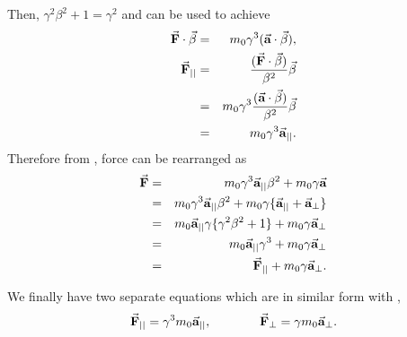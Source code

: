 \documentclass[a4paper,oneside,12pt]{report}
\numberwithin{equation}{chapter}
\begin{document}
Then, $\gamma^2 \beta^2 + 1 = \gamma^2 $ and  can be used to achieve
\vspace{-10pt}
\begin{eqnarray}
    \dotProd{\textbf{F}}{\beta} &=& m_0 \gamma^3 (\dotProd{\textbf{a}}{\beta} )   , \nonumber \\
    \vecthreeBF{F}_{||} &=& \frac{(\dotProd{\textbf{F}}{\beta})}{\beta^2} \vec{\beta} \nonumber \\
                        &=& m_0 \gamma^3 \frac{(\dotProd{\textbf{a}}{\beta} )}{\beta^2} \vec{\beta} \nonumber \\
                        &=& m_0 \gamma^3 \vecthreeBF{a}_{||} . \label{eq:Frel_parallel}
                        \vspace{-20pt}
\end{eqnarray}
Therefore from , force can be rearranged as
\vspace{-10pt}
\begin{eqnarray}
    \vecthreeBF{F}  &=& m_0 \gamma^3 \vecthreeBF{a}_{||} \beta^2 + m_0 \gamma \vecthreeBF{a} \nonumber\\
                    &=& m_0 \gamma^3 \vecthreeBF{a}_{||} \beta^2 + m_0 \gamma \{ \vecthreeBF{a}_{||} +  \vecthreeBF{a}_{\perp} \} \nonumber\\
                    &=& m_0 \vecthreeBF{a}_{||} \gamma \{ \gamma^2\beta^2 + 1 \} + m_0 \gamma \vecthreeBF{a}_{\perp} \nonumber\\
                    &=& m_0 \vecthreeBF{a}_{||} \gamma^3 + m_0 \gamma \vecthreeBF{a}_{\perp} \nonumber\\
                    &=& \vecthreeBF{F}_{||} + m_0 \gamma \vecthreeBF{a}_{\perp} .
                    \vspace{-10pt}
\end{eqnarray}

We finally have two separate equations which are in similar form with ,
\vspace{-10pt}
\begin{equation} \label{eq:Frel_para_and_perp}
    \begin{aligned}
        \vec{\textbf{F}}_{||} = \gamma^3  m_0 \vec{\textbf{a}}_{||}  ,
    \end{aligned}
    \qquad \qquad
    \begin{aligned}
        \vec{\textbf{F}}_{\perp} = \gamma  m_0\vec{\textbf{a}}_{\perp} .
    \end{aligned}
\end{equation}
\end{document}
